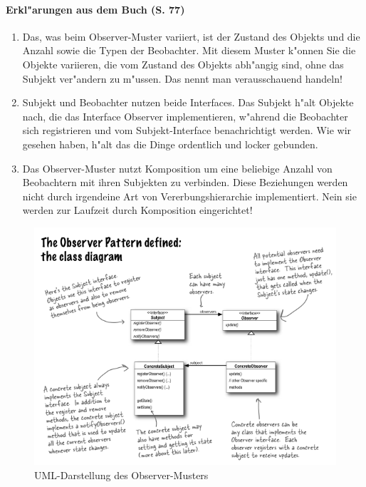 \paragraph{Erkl"arungen aus dem Buch (S. 77)}
\begin{enumerate}
\item Das, was beim Observer-Muster variiert, ist der Zustand des Objekts und die Anzahl sowie die 
   Typen der Beobachter. Mit diesem Muster k"onnen Sie die Objekte variieren, die vom Zustand des 
   Objekts abh"angig sind, ohne das Subjekt ver"andern zu m"ussen. Das nennt man verausschauend 
   handeln!
\item Subjekt und Beobachter nutzen beide Interfaces. Das Subjekt h"alt Objekte nach, die das 
   Interface Observer implementieren, w"ahrend die Beobachter sich registrieren und vom 
   Subjekt-Interface benachrichtigt werden. Wie wir gesehen haben, h"alt das die Dinge 
   ordentlich und locker gebunden. 
\item Das Observer-Muster nutzt Komposition um eine beliebige Anzahl von Beobachtern mit ihren 
   Subjekten zu verbinden. Diese Beziehungen werden nicht durch irgendeine Art von 
   Vererbungshierarchie implementiert. Nein sie werden zur Laufzeit durch Komposition eingerichtet!
\end{enumerate}

\FloatBarrier
\begin{figure}[b!]
	\centering
	\includegraphics[width=\linewidth]{observer/img/observerUML}
	\caption{UML-Darstellung des Observer-Musters}
	\label{fig:observerUML}
\end{figure}
